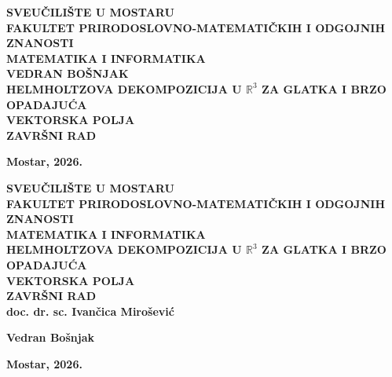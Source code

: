 \documentclass[12pt,a4paper]{article}
\begin{document}
\hypersetup{pageanchor=false}

\begin{center}
    \textmd{\bfseries \large SVEUČILIŠTE U MOSTARU\\ [0.25cm]FAKULTET PRIRODOSLOVNO-MATEMATIČKIH I ODGOJNIH ZNANOSTI}\\ [0.25cm]
    \textsc{\bfseries \large MATEMATIKA I INFORMATIKA} \\[3.5cm]
    {\large \textbf{VEDRAN BOŠNJAK}}\\[1.5cm]
    {\large \textbf{HELMHOLTZOVA DEKOMPOZICIJA U $\mathbb{R}^3$ ZA GLATKA I BRZO OPADAJUĆA}}\\
    {\textbf{\large VEKTORSKA POLJA}}\\[1.5cm]
    {\large \textbf{ZAVRŠNI RAD}}

    \vspace*{\fill}
    {\large \textbf{Mostar, 2026.}}
\end{center}

\clearpage
\begin{center}
    \textmd{\bfseries \large SVEUČILIŠTE U MOSTARU\\ [0.25cm]FAKULTET PRIRODOSLOVNO-MATEMATIČKIH I ODGOJNIH ZNANOSTI}\\ [0.25cm]
    \textsc{\bfseries \large MATEMATIKA I INFORMATIKA} \\[3.5cm]
    {\large \textbf{HELMHOLTZOVA DEKOMPOZICIJA U $\mathbb{R}^3$ ZA GLATKA I BRZO OPADAJUĆA}}\\
    {\textbf{\large VEKTORSKA POLJA}}\\[1.5cm]
    {\large \textbf{ZAVRŠNI RAD}}\\[1.5cm]
    {\large \textbf{doc. dr. sc. Ivančica Mirošević}}

    {\large \textbf{Vedran Bošnjak}}

    \vspace*{\fill}
    {\large \textbf{Mostar, 2026.}}
\end{center}
\end{document}
